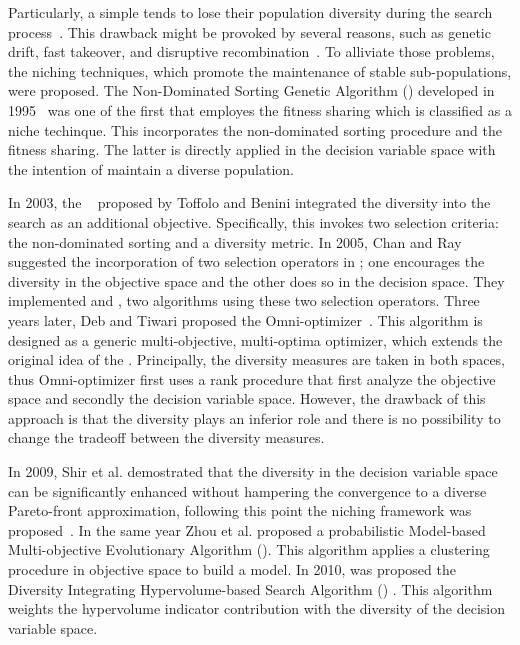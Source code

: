 Particularly, a simple \EA{} tends to lose their population diversity during the search process~\cite{mahfoud1995niching}.
%
This drawback might be provoked by several reasons, such as genetic drift, fast takeover, and disruptive recombination~\cite{preuss2005counteracting}.
%
To alliviate those problems, the niching techniques, which promote the maintenance of stable sub-populations, were proposed.
%
The Non-Dominated Sorting Genetic Algorithm (\NSGA{}) developed in 1995~\cite{srinivas1994muiltiobjective} was one of the first \MOEAS{} that employes the fitness sharing which is classified as a niche techinque.
%
This \MOEA{} incorporates the non-dominated sorting procedure and the fitness sharing.
%
The latter is directly applied in the decision variable space with the intention of maintain a diverse population.
%

In 2003, the \GDEA{}~\cite{toffolo2003genetic} proposed by Toffolo and Benini integrated the diversity into the search as an additional objective.
%
Specifically, this \MOEA{} invokes two selection criteria: the non-dominated sorting and a diversity metric.
%
In 2005, Chan and Ray \cite{chan2005evolutionary} suggested the incorporation of two selection operators in \MOEAS{}; one encourages the diversity in the objective space and the other does so in the decision space.
%
They implemented \KPone{} and \KPtwo{}, two algorithms using these two selection operators.
%
Three years later, Deb and Tiwari proposed the Omni-optimizer~\cite{deb2008omni}.
%
This algorithm is designed as a generic multi-objective, multi-optima optimizer, which extends the original idea of the \NSGA{}.
%
Principally, the diversity measures are taken in both spaces, thus Omni-optimizer first uses a rank procedure that first analyze the objective space and secondly the decision variable space.
%
However, the drawback of this approach is that the diversity plays an inferior role and there is no possibility to change the tradeoff between the diversity measures.
%

In 2009, Shir et al. demostrated that the diversity in the decision variable space can be significantly enhanced without hampering the convergence to a diverse Pareto-front approximation, following this point the \CMAES{} niching framework was proposed~\cite{shir2009enhancing}.
%
In the same year Zhou et al. proposed a probabilistic Model-based Multi-objective Evolutionary Algorithm (\MMEA{})\cite{zhou2009approximating}.
%
This algorithm applies a clustering procedure in objective space to build a model.
%
In 2010, was proposed the Diversity Integrating Hypervolume-based Search Algorithm (\DIVA{}) \cite{ulrich2010integrating}.
%
This algorithm weights the hypervolume indicator contribution with the diversity of the decision variable space.


